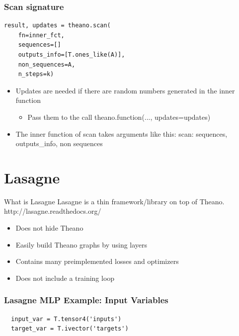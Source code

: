 \documentclass[utf8x,xcolor=pdftex,dvipsnames,table]{beamer}
\begin{document}
\begin{frame}[fragile]
  \frametitle{Scan signature}

\begin{lstlisting}
result, updates = theano.scan(
    fn=inner_fct,
    sequences=[]
    outputs_info=[T.ones_like(A)],
    non_sequences=A,
    n_steps=k)
\end{lstlisting}

\begin{itemize}
\item Updates are needed if there are random numbers generated in the inner function
\begin{itemize}
\item Pass them to the call theano.function(..., updates=updates)
\end{itemize}
\item The inner function of scan takes arguments like this:
   scan: sequences, outputs\_info, non sequences
\end{itemize}

\end{frame}
\fi

\section{Lasagne}
\begin{frame}
  \tableofcontents[currentsection]
\end{frame}

\begin{frame}{What is Lasagne}
  Lasagne is a thin framework/library on top of Theano.
  http://lasagne.readthedocs.org/
  \begin{itemize}
  \item Does not hide Theano
  \item Easily build Theano graphs by using layers
  \item Contains many preimplemented losses and optimizers
  \item Does not include a training loop
  \end{itemize}
\end{frame}


\begin{frame}[fragile]
  \frametitle{Lasagne MLP Example: Input Variables}

\begin{lstlisting}
  input_var = T.tensor4('inputs')
  target_var = T.ivector('targets')
\end{lstlisting}
\end{frame}
\end{document}
